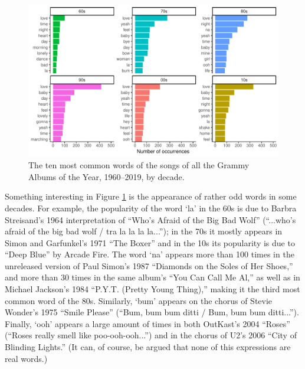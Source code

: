 \documentclass{article}
\newenvironment{aside}
  {\begin{mdframed}[style=0,%
      leftline=false,rightline=false,leftmargin=2em,rightmargin=2em,%
          innerleftmargin=0pt,innerrightmargin=0pt,linewidth=0.75pt,%
      skipabove=7pt,skipbelow=7pt]\small}
  {\end{mdframed}}
\begin{document}

\begin{figure}[h]
    \centering
    \includegraphics[scale=0.65]{Plots/graph_common_words_decade_FW.pdf}
    \caption{The ten most common words of the songs of all the Grammy Albums of the Year, 1960--2019, by decade.}
    \label{fig:common_words_decade}
\end{figure}


\FloatBarrier


\begin{aside}
        Something interesting in Figure \ref{fig:common_words_decade} is the appearance of rather odd words in some decades. For example, the popularity of the word `la' in the 60s is due to Barbra Streisand's 1964 interpretation of ``Who's Afraid of the Big Bad Wolf'' (``...who's afraid of the big bad wolf / tra la la la la...''); in the 70s it mostly appears in Simon and Garfunkel's 1971 ``The Boxer'' and in the 10s its popularity is due to ``Deep Blue'' by Arcade Fire. The word `na' appears more than 100 times in the unreleased version of Paul Simon's 1987 ``Diamonds on the Soles of Her Shoes,'' and more than 30 times in the same album's ``You Can Call Me Al,'' as well as in Michael Jackson's 1984 ``P.Y.T. (Pretty Young Thing),'' making it the third most common word of the 80s. Similarly, `bum' appears on the chorus of Stevie Wonder's 1975 ``Smile Please'' (``Bum, bum bum ditti / Bum, bum bum ditti...''). Finally, `ooh' appears a large amount of times in both OutKast's 2004 ``Roses'' (``Roses really smell like poo-ooh-ooh...'') and in the chorus of U2's 2006 ``City of Blinding Lights.'' (It can, of course, be argued that none of this expressions are real words.)
\end{aside}
\end{document}
